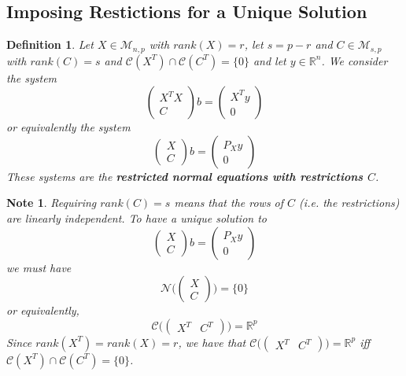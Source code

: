 \documentclass[12pt]{amsart}
\newtheorem{defn}[thm]{Definition}
\newtheorem{note}[thm]{Note}
\newcommand{\R}{\mathbb{R}}
\newcommand{\MC}{\mathcal{C}}
\newcommand{\MN}{\mathcal{N}}
\newcommand{\MM}{\mathcal{M}}
\begin{document}
\subsection{Imposing Restictions for a Unique Solution}

\begin{defn} Let $X \in \MM_{n,p}$ with $rank(X) = r$, let $s = p - r$ and $C \in \MM_{s, p}$ with $rank(C) = s$ and $\MC(X^T) \cap \MC(C^T) = \{0\}$ and let $y \in \R^n$. We consider the system 
$$\begin{pmatrix}
X^TX \\
C
\end{pmatrix} b = 
\begin{pmatrix}
X^Ty \\
0
\end{pmatrix} $$
or equivalently the system
$$\begin{pmatrix}
X \\
C
\end{pmatrix} b = 
\begin{pmatrix}
P_Xy \\
0
\end{pmatrix} $$
These systems are the \textbf{ restricted normal equations with restrictions $C$}.
\end{defn}

\begin{note}
Requiring $rank(C) = s$ means that the rows of $C$ (i.e. the restrictions) are linearly independent. To have a unique solution to $$\begin{pmatrix}
X \\
C
\end{pmatrix} b = 
\begin{pmatrix}
P_Xy \\
0
\end{pmatrix} $$ we must have $$\MN\big( \begin{pmatrix}
X \\
C
\end{pmatrix}  \big) = \{0\}$$ or equivalently, $$\MC\big( \begin{pmatrix}
X^T & C^T
\end{pmatrix}\big) = \R^p$$
Since $rank(X^T) = rank(X) = r$, we have that $\MC\big( \begin{pmatrix}
X^T & C^T
\end{pmatrix} \big) = \R^p$ iff $\MC(X^T) \cap \MC(C^T) = \{0\}$. 
\end{note}
\end{document}
